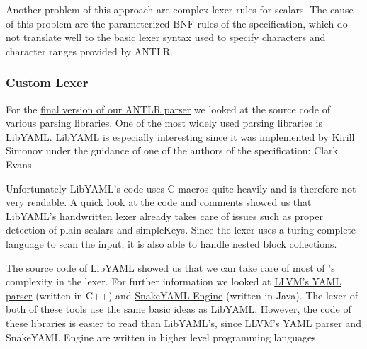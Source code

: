 \begin{listing}
  \begin{code-boxed}
    \inputminted[linenos]{yaml}{Data/Correct/list.yaml}
  \end{code-boxed}
  \caption{Our indent/detend YAML parser is not able to handle the simple input above correctly. It expects an indent or detend \gls{token} in line 4, since the lexer adds an indent \gls{token} before the \gls{token}  in line 3 and a detend \gls{token} afterwards. Ideally the lexer would not add these \glspl{token}, since  is just a simple scalar that – unlike a sequence or map – does not start or end a new level.}
  \label{lst:correct_list}
\end{listing}

Another problem of this approach are complex lexer rules for  scalars. The cause of this problem are the parameterized BNF rules of the  specification, which do not translate well to the basic lexer syntax used to specify characters and character ranges provided by \gls{ANTLR}.

\subsubsection{Custom Lexer}

For the \href{https://www.libelektra.org/plugins/yanlr}{final version of our ANTLR parser} we looked at the source code of various  parsing libraries. One of the most widely used parsing libraries is \href{https://github.com/yaml/libyaml}{LibYAML}. LibYAML is especially interesting since it was implemented by Kirill Simonov under the guidance of one of the authors of the  specification: Clark Evans~\cite{libyaml2018pyyaml}.

Unfortunately LibYAML’s code uses C macros quite heavily and is therefore not very readable. A quick look at the code and comments showed us that LibYAML’s handwritten lexer already takes care of issues such as proper detection of plain scalars and \glspl{simpleKey}. Since the lexer uses a turing-complete language to scan the input, it is also able to handle nested block \glspl{collection}.

The source code of LibYAML showed us that we can take care of most of ’s  complexity in the lexer. For further information we looked at \href{https://github.com/llvm/llvm-project/blob/master/llvm/lib/Support/YAMLParser.cpp}{LLVM’s YAML parser} (written in C++) and \href{https://bitbucket.org/asomov/snakeyaml-engine}{SnakeYAML Engine} (written in Java). The lexer of both of these tools use the same basic ideas as LibYAML. However, the code of these libraries is easier to read than LibYAML’s, since LLVM’s YAML parser and SnakeYAML Engine are written in higher level programming languages.


